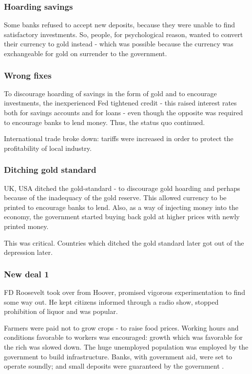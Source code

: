\documentclass[oneside, article]{memoir}
\begin{document}
\subsubsection{Hoarding savings}
Some banks refused to accept new deposits, because they were unable to find satisfactory investments. So, people, for psychological reason, wanted to convert their currency to gold instead - which was possible because the currency was exchangeable for gold on surrender to the government.

\subsubsection{Wrong fixes}
To discourage hoarding of savings in the form of gold and to encourage investments, the inexperienced Fed tightened credit - this raised interest rates both for savings accounts and for loans - even though the opposite was required to encourage banks to lend money. Thus, the status quo continued.

International trade broke down: tariffs were increased in order to protect the profitability of local industry.

\subsubsection{Ditching gold standard}
UK, USA ditched the gold-standard - to discourage gold hoarding and perhaps because of the inadequacy of the gold reserve. This allowed currency to be printed to encourage banks to lend. Also, as a way of injecting money into the economy, the government started buying back gold at higher prices with newly printed money.

This was critical. Countries which ditched the gold standard later got out of the depression later.

\subsubsection{New deal 1}
FD Roosevelt took over from Hoover, promised vigorous experimentation to find some way out. He kept citizens informed through a radio show, stopped prohibition of liquor and was popular.

Farmers were paid not to grow crops - to raise food prices. Working hours and conditions favorable to workers was encouraged: growth which was favorable for the rich was slowed down. The huge unemployed population was employed by the government to build infrastructure. Banks, with government aid, were set to operate soundly; and small deposits were guaranteed by the government .
\end{document}
